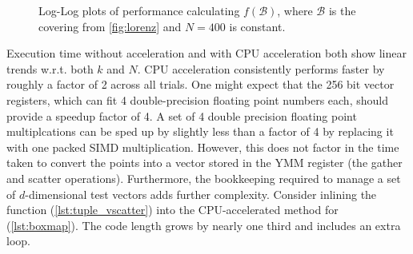 \begin{figure}[ht!]
    \centering
    \caption{
        Log-Log plots of performance calculating $f(\mathcal{B})$, where $\mathcal{B}$ is the covering from \autoref{fig:lorenz} and $N = 400$ is constant.
    }
    \label{fig:steps}
\end{figure}

Execution time without acceleration and with CPU acceleration both show linear trends 
w.r.t. both $k$ and $N$. CPU acceleration consistently performs faster by roughly a factor of 2 
across all trials. One might expect that the 256 bit vector registers, which can fit 4 
double-precision floating point numbers each, should provide a speedup factor of 4. 
A set of 4 double precision floating point multiplcations can be sped up by slightly less 
than a factor of 4 by replacing it with one packed SIMD multiplication. However, this does 
not factor in the time taken to convert the points into a vector stored in the YMM 
register (the gather and scatter operations). Furthermore, the bookkeeping required to 
manage a set of $d$-dimensional test vectors adds further complexity. Consider inlining 
the function  (\autoref{lst:tuple_vscatter}) into the 
CPU-accelerated method for  (\autoref{lst:boxmap}). The code length grows 
by nearly one third and includes an extra  loop. \\


